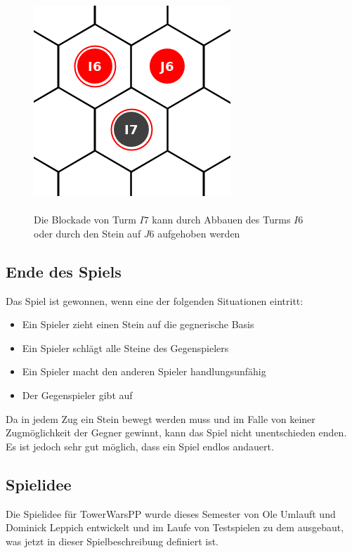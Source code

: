 \begin{figure}[ht]
\begin{center}
\includegraphics[scale=0.25]{graphic/tower-unblock.png} \\
\hspace{10pt}\\
Die Blockade von Turm $I7$ kann durch Abbauen des Turms $I6$\\ oder durch den Stein auf $J6$ aufgehoben werden
\end{center}
\end{figure}

\subsection*{Ende des Spiels}
Das Spiel ist gewonnen, wenn eine der folgenden Situationen eintritt:
\begin{itemize}
\item Ein Spieler zieht einen Stein auf die gegnerische Basis
\item Ein Spieler schlägt alle Steine des Gegenspielers
\item Ein Spieler macht den anderen Spieler handlungsunfähig
\item Der Gegenspieler gibt auf
\end{itemize}

Da in jedem Zug ein Stein bewegt werden muss und im Falle von keiner Zugmöglichkeit der Gegner gewinnt, kann das Spiel nicht unentschieden enden. Es ist jedoch sehr gut möglich, dass ein Spiel endlos andauert.

\subsection*{Spielidee}
Die Spielidee für TowerWarsPP wurde dieses Semester von Ole Umlauft und Dominick Leppich entwickelt und im Laufe von Testspielen zu dem ausgebaut, was jetzt in dieser Spielbeschreibung definiert ist.
